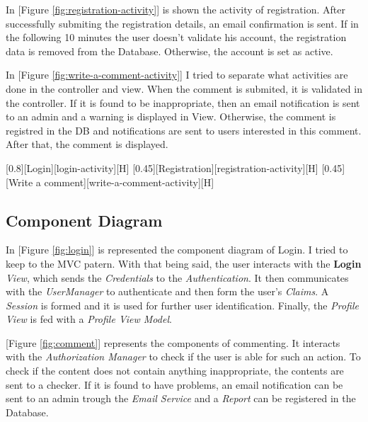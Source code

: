 \documentclass{article}
\begin{document}
			\bigskip
			In [Figure \ref{fig:registration-activity}] is shown the activity of registration. After successfully submiting the registration details, an email confirmation is sent. If in the following 10 minutes the user doesn't validate his account, the registration data is removed from the Database. Otherwise, the account is set as active.

			\bigskip
			In [Figure \ref{fig:write-a-comment-activity}] I tried to separate what activities are done in the controller and view. When the comment is submited, it is validated in the controller. If it is found to be inappropriate, then an email notification is sent to an admin and a warning is displayed in View. Otherwise, the comment is registred in the DB and notifications are sent to users interested in this comment. After that, the comment is displayed.

			[0.8][Login][login-activity][H]
			[0.45][Registration][registration-activity][H]
			[0.45][Write a comment][write-a-comment-activity][H]

		\subsection{Component Diagram}
			In [Figure \ref{fig:login}] is represented the component diagram of Login. I tried to keep to the MVC patern. With that being said, the user interacts with the \textbf{Login} \textit{View}, which sends the \textit{Credentials} to the \textit{Authentication}. It then communicates with the \textit{UserManager} to authenticate and then form the user's \textit{Claims}. A \textit{Session} is formed and it is used for further user identification. Finally, the \textit{Profile View} is fed with a \textit{Profile View Model}.

			\bigskip
			[Figure \ref{fig:comment}] represents the components of commenting. It interacts with the \textit{Authorization Manager} to check if the user is able for such an action. To check if the content does not contain anything inappropriate, the contents are sent to a checker. If it is found to have problems, an email notification can be sent to an admin trough the \textit{Email Service} and a \textit{Report} can be registered in the Database.
\end{document}
